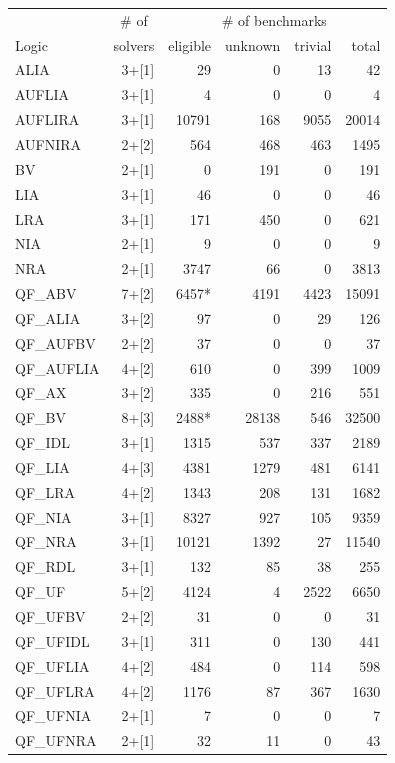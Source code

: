 \documentclass[twoside,11pt]{article}
\begin{document}
\begin{table}
\centering
\begin{tabular}{|l|r|r|r|r|r|}
\hline
       & \multicolumn{1}{|c|}{\# of} & \multicolumn{4}{|c|}{\# of benchmarks} \\
 Logic & solvers & eligible & unknown  & trivial & total  \\
\hline
ALIA & 3+[1] & 29 & 0 & 13 & 42 \\
AUFLIA & 3+[1] & 4 & 0 & 0 & 4\\
AUFLIRA & 3+[1] & 10791 & 168 & 9055 & 20014 \\
AUFNIRA & 2+[2] & 564 & 468 & 463 & 1495 \\
BV & 2+[1] & 0 & 191 & 0 & 191 \\
LIA & 3+[1] & 46 & 0 & 0 & 46 \\
LRA & 3+[1] & 171 & 450 & 0 & 621\\
NIA & 2+[1] & 9 & 0 & 0 & 9\\
NRA & 2+[1] & 3747 & 66 & 0 & 3813 \\
QF\_ABV & 7+[2] & 6457* & 4191 & 4423 & 15091 \\
QF\_ALIA & 3+[2] & 97 & 0 & 29 & 126 \\
QF\_AUFBV & 2+[2] & 37 & 0 & 0 & 37 \\
QF\_AUFLIA & 4+[2] & 610 & 0 & 399 & 1009\\
QF\_AX & 3+[2] & 335 & 0 & 216 & 551 \\
QF\_BV & 8+[3] & 2488* & 28138 & 546 & 32500 \\
QF\_IDL & 3+[1] & 1315 & 537 & 337 & 2189 \\
QF\_LIA & 4+[3] & 4381 & 1279 & 481 & 6141 \\
QF\_LRA & 4+[2] & 1343 & 208 & 131 & 1682\\ 
QF\_NIA & 3+[1] & 8327 & 927 & 105 & 9359 \\
QF\_NRA & 3+[1] & 10121 & 1392 & 27 & 11540 \\
QF\_RDL & 3+[1] & 132 & 85 & 38 & 255 \\
QF\_UF & 5+[2] & 4124 & 4 & 2522 & 6650 \\
QF\_UFBV & 2+[2] & 31 & 0 & 0 & 31 \\
QF\_UFIDL & 3+[1] & 311 & 0 & 130 & 441\\
QF\_UFLIA & 4+[2] & 484 & 0 & 114 & 598 \\
QF\_UFLRA & 4+[2] & 1176 & 87 & 367 & 1630 \\
QF\_UFNIA & 2+[1] & 7 & 0 &0 & 7 \\
QF\_UFNRA & 2+[1] & 32 & 11 & 0 & 43\\

\end{tabular}
\end{table}
\end{document}
